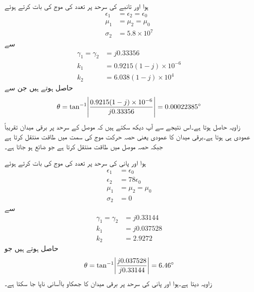 ہوا اور تانبے کی سرحد پر  تعدد کی موج کی بات کرتے ہوئے
\begin{align*}
\epsilon_1&=\epsilon_2=\epsilon_0\\
\mu_1&=\mu_2=\mu_0\\
\sigma_2&=5.8\times 10^{7}
\end{align*}
سے
\begin{align*}
\gamma_1 =\gamma_2&= j 0.33356 \\
k_1&=0.9215(1-j) \times 10^{-6} \\
k_2&=6.038 (1-j)\times 10^4
\end{align*}
حاصل ہوتے ہیں جن سے
\begin{align*}
\theta=\tan^{-1} \abs{\frac{0.9215(1-j) \times 10^{-6}}{ j 0.33356}}=0.00022385^{\circ}
\end{align*}
زاویہ حاصل ہوتا  ہے۔اس نتیجے سے آپ دیکھ سکتے ہیں کہ موصل کے سرحد پر برقی میدان تقریباً عمودی ہی ہوتا ہے۔برقی میدان کا عمودی یعنی  حصہ حرکت موج کی سمت  میں طاقت منتقل کرتا ہے جبکہ  حصہ موصل میں طاقت منتقل کرتا ہے جو ضائع ہو جاتا ہے۔


ہوا اور پانی  کی سرحد پر  تعدد کی موج کی بات کرتے ہوئے
\begin{align*}
\epsilon_1&=\epsilon_0\\
\epsilon_2&=78 \epsilon_0\\
\mu_1&=\mu_2=\mu_0\\
\sigma_2&=0
\end{align*}
سے
\begin{align*}
\gamma_1 =\gamma_2&= j 0.33144 \\
k_1&=j 0.037528 \\
k_2&=2.9272
\end{align*}
حاصل ہوتے ہیں جو
\begin{align*}
\theta=\tan^{-1} \abs{\frac{j 0.037528 }{  j 0.33144}}=6.46^{\circ}
\end{align*}
زاویہ دیتا ہے۔ہوا اور پانی کی سرحد پر برقی میدان کا جھکاو باآسانی ناپا جا سکتا ہے۔

